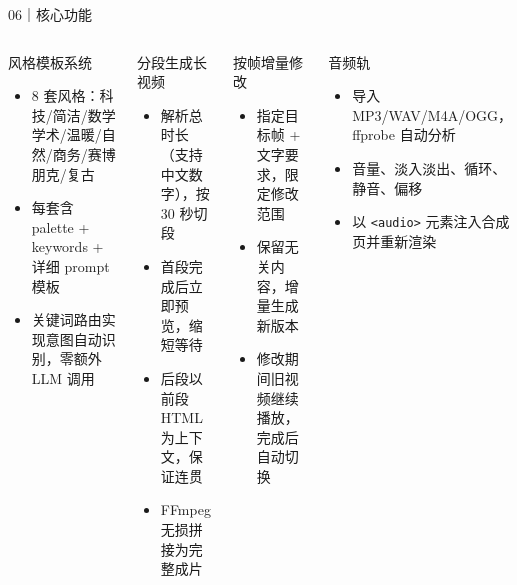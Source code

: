 \documentclass[aspectratio=169,UTF8,11pt]{ctexbeamer}
\begin{document}
\begin{frame}{06｜核心功能}
  \begin{columns}[T,onlytextwidth]
      \begin{block}{风格模板系统}
        \begin{itemize}
          \item 8 套风格：科技/简洁/数学学术/温暖/自然/商务/赛博朋克/复古
          \item 每套含 palette + keywords + 详细 prompt 模板
          \item 关键词路由实现意图自动识别，零额外 LLM 调用
        \end{itemize}
      \end{block}
      \begin{block}{分段生成长视频}
        \begin{itemize}
          \item 解析总时长（支持中文数字），按 30 秒切段
          \item 首段完成后立即预览，缩短等待
          \item 后段以前段 HTML 为上下文，保证连贯
          \item FFmpeg 无损拼接为完整成片
        \end{itemize}
      \end{block}
      \begin{block}{按帧增量修改}
        \begin{itemize}
          \item 指定目标帧 + 文字要求，限定修改范围
          \item 保留无关内容，增量生成新版本
          \item 修改期间旧视频继续播放，完成后自动切换
        \end{itemize}
      \end{block}
      \begin{block}{音频轨}
        \begin{itemize}
          \item 导入 MP3/WAV/M4A/OGG，ffprobe 自动分析
          \item 音量、淡入淡出、循环、静音、偏移
          \item 以 \texttt{<audio>} 元素注入合成页并重新渲染
        \end{itemize}
      \end{block}
  \end{columns}
\end{frame}
\end{document}
